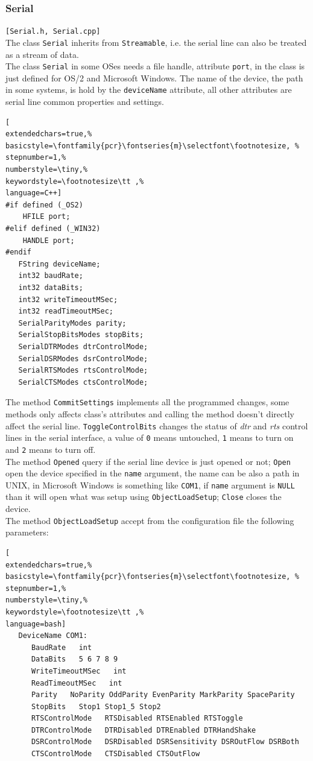 \subsubsection{Serial}
\texttt{[Serial.h, Serial.cpp]}\\
The class \texttt{Serial} inherits from \texttt{Streamable}, i.e. the serial line can also be treated as a stream of data.\\


The class \texttt{Serial} in some OSes needs a file handle, attribute \texttt{port}, in the class is just defined for OS/2 and Microsoft Windows. The name of the device, the path in some systems, is hold by the \texttt{deviceName} attribute, all other attributes are serial line common properties and settings.
\begin{lstlisting}[
extendedchars=true,%
basicstyle=\fontfamily{pcr}\fontseries{m}\selectfont\footnotesize, %
stepnumber=1,%
numberstyle=\tiny,%
keywordstyle=\footnotesize\tt ,%
language=C++]
#if defined (_OS2)
    HFILE port;
#elif defined (_WIN32)
    HANDLE port;
#endif
   FString deviceName;
   int32 baudRate;
   int32 dataBits;
   int32 writeTimeoutMSec;
   int32 readTimeoutMSec;
   SerialParityModes parity;
   SerialStopBitsModes stopBits;
   SerialDTRModes dtrControlMode;
   SerialDSRModes dsrControlMode;
   SerialRTSModes rtsControlMode;
   SerialCTSModes ctsControlMode;
\end{lstlisting}

The method \texttt{CommitSettings} implements all the programmed changes, some methods only affects class's attributes and calling the method doesn't directly affect the serial line. \texttt{ToggleControlBits} changes the status of \textit{dtr} and \textit{rts} control lines in the serial interface, a value of \texttt{0} means untouched, \texttt{1} means to turn on and \texttt{2} means to turn off.\\


The method \texttt{Opened} query if the serial line device is just opened or not; \texttt{Open} open the device specified in the \texttt{name} argument, the name can be also a path in UNIX, in Microsoft Windows is something like \texttt{COM1}, if \texttt{name} argument is \texttt{NULL} than it will open what was setup using \texttt{ObjectLoadSetup}; \texttt{Close} closes the device.\\


The method \texttt{ObjectLoadSetup} accept from the configuration file the following parameters:
\begin{lstlisting}[
extendedchars=true,%
basicstyle=\fontfamily{pcr}\fontseries{m}\selectfont\footnotesize, %
stepnumber=1,%
numberstyle=\tiny,%
keywordstyle=\footnotesize\tt ,%
language=bash]
   DeviceName COM1:
      BaudRate   int
      DataBits   5 6 7 8 9
      WriteTimeoutMSec   int
      ReadTimeoutMSec   int
      Parity   NoParity OddParity EvenParity MarkParity SpaceParity
      StopBits   Stop1 Stop1_5 Stop2
      RTSControlMode   RTSDisabled RTSEnabled RTSToggle
      DTRControlMode   DTRDisabled DTREnabled DTRHandShake
      DSRControlMode   DSRDisabled DSRSensitivity DSROutFlow DSRBoth
      CTSControlMode   CTSDisabled CTSOutFlow
\end{lstlisting}

